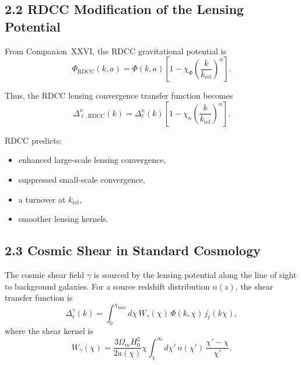 \documentclass[11pt,a4paper]{article}
\begin{document}
\subsection*{2.2 RDCC Modification of the Lensing Potential}

From Companion~XXVI, the RDCC gravitational potential is
\begin{equation}
    \Phi_{\mathrm{RDCC}}(k,a)
    = \Phi(k,a)
      \left[
        1 - \chi_{\Phi}
        \left(\frac{k}{k_{\mathrm{rel}}}\right)^{\alpha}
      \right].
\end{equation}

Thus, the RDCC lensing convergence transfer function becomes
\begin{equation}
    \Delta_{\ell,\mathrm{RDCC}}^{\kappa}(k)
    = \Delta_{\ell}^{\kappa}(k)
      \left[
        1 - \chi_{\kappa}
        \left(\frac{k}{k_{\mathrm{rel}}}\right)^{\alpha}
      \right].
\end{equation}

RDCC predicts:

\begin{itemize}
    \item enhanced large-scale lensing convergence,
    \item suppressed small-scale convergence,
    \item a turnover at $k_{\mathrm{rel}}$,
    \item smoother lensing kernels.
\end{itemize}

\subsection*{2.3 Cosmic Shear in Standard Cosmology}

The cosmic shear field $\gamma$ is sourced by the lensing potential along the line of sight 
to background galaxies. For a source redshift distribution $n(z)$, the shear transfer 
function is
\begin{equation}
    \Delta_{\ell}^{\gamma}(k)
    = \int_{0}^{\chi_{\mathrm{max}}} d\chi\,
      W_{\gamma}(\chi)\,
      \Phi(k,\chi)\,
      j_{\ell}(k\chi),
\end{equation}
where the shear kernel is
\begin{equation}
    W_{\gamma}(\chi)
    = \frac{3\Omega_{m}H_{0}^{2}}{2a(\chi)}
      \chi
      \int_{\chi}^{\infty} d\chi'\,
      n(\chi')\,
      \frac{\chi' - \chi}{\chi'}.
\end{equation}
\end{document}
